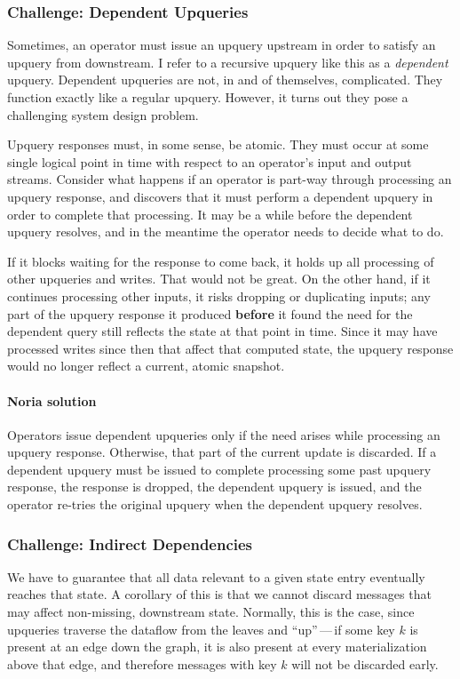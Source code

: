 \documentclass[12pt,letterpaper,twoside]{article}
\begin{document}
\subsubsection{Challenge: Dependent Upqueries}

Sometimes, an operator must issue an upquery upstream in order to
satisfy an upquery from downstream. I refer to a recursive upquery like
this as a \emph{dependent} upquery. Dependent upqueries are not, in and of
themselves, complicated. They function exactly like a regular upquery.
However, it turns out they pose a challenging system design problem.

Upquery responses must, in some sense, be atomic. They must occur at
some single logical point in time with respect to an operator's input
and output streams. Consider what happens if an operator is part-way
through processing an upquery response, and discovers that it must
perform a dependent upquery in order to complete that processing. It may
be a while before the dependent upquery resolves, and in the meantime
the operator needs to decide what to do.

If it blocks waiting for the response to come back, it holds up all
processing of other upqueries and writes. That would not be great. On
the other hand, if it continues processing other inputs, it risks
dropping or duplicating inputs; any part of the upquery response it
produced \textbf{before} it found the need for the dependent query still
reflects the state at that point in time. Since it may have processed
writes since then that affect that computed state, the upquery response
would no longer reflect a current, atomic snapshot.

\paragraph{Noria solution}
Operators issue dependent upqueries only if the need arises while processing an
upquery response. Otherwise, that part of the current update is discarded. If a
dependent upquery must be issued to complete processing some past upquery
response, the response is dropped, the dependent upquery is issued, and the
operator re-tries the original upquery when the dependent upquery resolves.

\subsubsection{Challenge: Indirect Dependencies}

We have to guarantee that all data relevant to a given state entry
eventually reaches that state. A corollary of this is that we cannot
discard messages that may affect non-missing, downstream state.
Normally, this is the case, since upqueries traverse the dataflow from
the leaves and ``up''\,---\,if some key $k$ is present at an edge down the
graph, it is also present at every materialization above that edge, and
therefore messages with key $k$ will not be discarded early.
\end{document}
